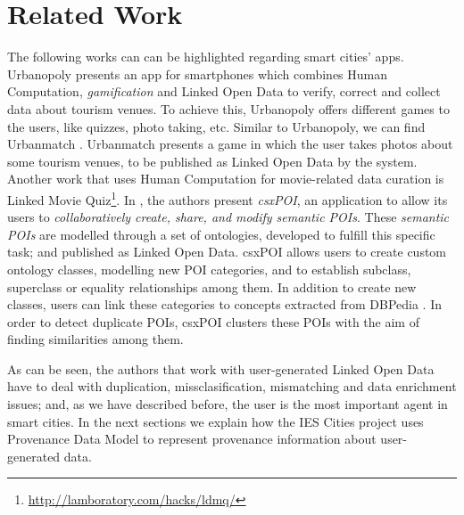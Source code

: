 \section{Related Work}
\label{sec:state_of_the_art}

The following works can can be highlighted regarding smart cities' apps. Urbanopoly \cite{celino_urbanopoly_2012} presents an app for smartphones which combines Human Computation, \textit{gamification} and Linked Open Data to verify, correct and collect data about tourism venues. To achieve this, Urbanopoly offers different games to the users, like quizzes, photo taking, etc. Similar to Urbanopoly, we can find Urbanmatch \cite{celino_urbanmatch_2012}. Urbanmatch presents a game in which the user takes photos about some tourism venues, to be published as Linked Open Data by the system. Another work that uses Human Computation for movie-related data curation is Linked Movie Quiz\footnote{\url{http://lamboratory.com/hacks/ldmq/}}. In \cite{braun_collaborative_2007}, the authors present \textit{csxPOI}, an application to allow its users to \textit{collaboratively create, share, and modify semantic POIs}. These \textit{semantic POIs} are modelled through a set of ontologies, developed to fulfill this specific task; and published as Linked Open Data. csxPOI allows users to create custom ontology classes, modelling new POI categories, and to establish subclass, superclass or equality relationships among them. In addition to create new classes, users can link these categories to concepts extracted from DBPedia \cite{auer_dbpedia:_2007}. In order to detect duplicate POIs, csxPOI clusters these POIs with the aim of finding similarities among them.

As can be seen, the authors that work with user-generated Linked Open Data have to deal with duplication, missclasification, mismatching and data enrichment issues; and, as we have described before, the user is the most important agent in smart cities. In the next sections we explain how the IES Cities project uses Provenance Data Model to represent provenance information about user-generated data.
